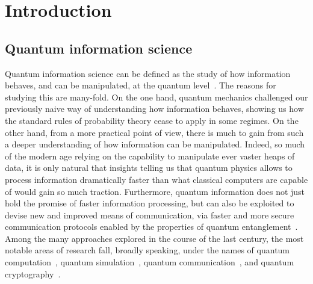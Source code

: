 
\chapter{Introduction}
\label{chapter:introduction}

\section{Quantum information science}

Quantum information science can be defined as the study of how information behaves, and can be manipulated, at the quantum level~\cite{nielsen2006quantum,watrous2018theory}.
The reasons for studying this are many-fold. On the one hand, quantum mechanics challenged our previously naive way of understanding how information behaves, showing us how the standard rules of probability theory cease to apply in some regimes.
On the other hand, from a more practical point of view, there is much to gain from such a deeper understanding of how information can be manipulated. Indeed, so much of the modern age relying on the capability to manipulate ever vaster heaps of data, it is only natural that insights telling us that quantum physics allows to process information dramatically faster than what classical computers are capable of would gain so much traction.
Furthermore, quantum information does not just hold the promise of faster information processing, but can also be exploited to devise new and improved means of communication, via faster and more secure communication protocols enabled by the properties of quantum entanglement~\cite{gisin2002quantum,krenn2016quantum,pirandola2019advances}.
Among the many approaches explored in the course of the last century, the most notable areas of research fall, broadly speaking, under the names of quantum computation~\cite{shor1997polynomial,steane1998quantum,ladd2010quantum}, quantum simulation~\cite{lloyd1996universal,georgescu2014quantum,koch2019quantum}, quantum communication~\cite{bennett1993teleporting}, and quantum cryptography~\cite{bennett2014quantum}.


